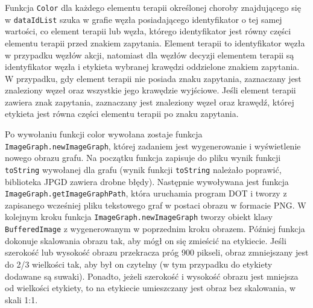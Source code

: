 Funkcja \texttt{Color} dla każdego elementu terapii określonej choroby znajdującego się w \texttt{dataIdList} szuka w grafie węzła posiadającego identyfikator o tej samej wartości, co element terapii lub węzła, którego identyfikator jest równy części elementu terapii przed znakiem zapytania. Element terapii to identyfikator węzła w przypadku węzłów akcji, natomiast dla węzłów decyzji elementem terapii są identyfikator węzła i etykieta wybranej krawędzi oddzielone znakiem zapytania.
W przypadku, gdy element terapii nie posiada znaku zapytania, zaznaczany jest znaleziony węzeł oraz wszystkie jego krawędzie wyjściowe.  Jeśli element terapii zawiera znak zapytania, zaznaczany jest znaleziony węzeł oraz krawędź, której etykieta jest równa części elementu terapii po znaku zapytania.
 
Po wywołaniu funkcji color wywołana zostaje funkcja \texttt{ImageGraph.newImageGraph}, której zadaniem jest wygenerowanie i wyświetlenie nowego obrazu grafu. Na początku funkcja zapisuje do pliku wynik funkcji \texttt{toString} wywołanej dla grafu (wynik funkcji \texttt{toString} należało poprawić, biblioteka JPGD zawiera drobne błędy). Następnie wywoływana jest funkcja \texttt{ImageGraph.getImageGraphPath}, która uruchamia program DOT i tworzy z zapisanego wcześniej pliku tekstowego graf w postaci obrazu w formacie PNG. W kolejnym kroku funkcja \texttt{ImageGraph.newImageGraph} tworzy obiekt klasy \texttt{BufferedImage} z wygenerowanym w poprzednim kroku obrazem. Później funkcja dokonuje skalowania obrazu tak, aby mógł on się zmieścić na etykiecie. 
Jeśli szerokość lub wysokość obrazu przekracza próg 900 pikseli, obraz zmniejszany jest do 2/3 wielkości tak, aby był on czytelny (w tym przypadku do etykiety dodawane są suwaki). Ponadto, jeżeli szerokość i wysokość obrazu jest mniejsza od wielkości etykiety, to na etykiecie umieszczany jest obraz bez skalowania, w skali 1:1.
 
